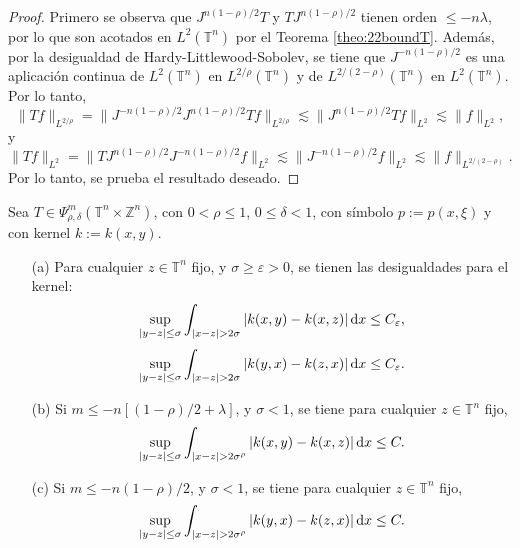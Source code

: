 \begin{proof}
	Primero se observa que $J^{n(1-\rho)/2}T$ y $TJ^{n(1-\rho)/2}$ tienen orden $\leq -n\lambda$, por lo que son acotados en $L^2(\mathbb{T}^n)$ por el Teorema \ref{theo:22boundT}. Además, por la desigualdad de Hardy-Littlewood-Sobolev, se tiene que $J^{-n(1-\rho)/2}$ es una aplicación continua de $L^2(\mathbb{T}^n)$ en $L^{2/\rho}(\mathbb{T}^n)$ y de $L^{2/(2-\rho)}(\mathbb{T}^n)$ en $L^2(\mathbb{T}^n)$. Por lo tanto, 
	\begin{equation*}
		\| Tf \|_{L^{2/\rho}} = \| J^{-n(1-\rho)/2}J^{n(1-\rho)/2}Tf\|_{L^{2/\rho}} \lesssim \| J^{n(1-\rho)/2}Tf \|_{L^2} \lesssim \| f \|_{L^2},
	\end{equation*}
	y 
	\begin{equation*}
		\| Tf \|_{L^2} = \| TJ^{n(1-\rho)/2}J^{-n(1-\rho)/2}f\|_{L^2} \lesssim \| J^{-n(1-\rho)/2}f \|_{L^2} \lesssim \|f\|_{L^{2/(2-\rho)}}.
	\end{equation*}
	Por lo tanto, se prueba el resultado deseado.
\end{proof}
\begin{theorem}	\label{theo:kernel-estimate-sigma}
	Sea $T \in \Psi^m_{\rho, \delta}(\mathbb{T}^n \times \mathbb{Z}^n) $, con $0 < \rho \leq 1$, $0 \leq \delta < 1$, con símbolo $p:=p(x, \xi)$ y con kernel $k:=k(x, y)$. 
	\begin{itemize}
		\item[(a)] Para cualquier $z \in \mathbb{T}^n$ fijo, y $\sigma \geq \varepsilon > 0$, se tienen las desigualdades para el kernel:
		\begin{equation}
			\sup_{|y-z| \leq \sigma} \int_{|x-z| > 2\sigma}|k(x, y) - k(x, z)|\mathop{}\!\mathrm{d} x \leq C_\varepsilon,
		\end{equation}
		\begin{equation}
			\sup_{|y-z| \leq \sigma} \int_{|x-z| > 2\sigma}|k(y, x) - k(z, x)|\mathop{}\!\mathrm{d} x \leq C_\varepsilon.
		\end{equation}
		\item[(b)] Si $m \leq -n [(1-\rho)/2 + \lambda] $, y $\sigma < 1$, se tiene para cualquier $z \in \mathbb{T}^n$ fijo, 
		\begin{equation}
			\sup_{|y-z| \leq \sigma} \int_{|x-z| > 2\sigma^\rho}|k(x, y) - k(x, z)|\mathop{}\!\mathrm{d} x \leq C.
		\end{equation}
		\item[(c)] Si $m \leq -n (1 - \rho) / 2$, y $\sigma < 1$, se tiene para cualquier $z \in \mathbb{T}^n$ fijo,
		\begin{equation}
			\sup_{|y-z| \leq \sigma} \int_{|x-z| > 2\sigma^\rho}|k(y, x) - k(z, x)|\mathop{}\!\mathrm{d} x \leq C.
		\end{equation} 
	\end{itemize}
\end{theorem}
